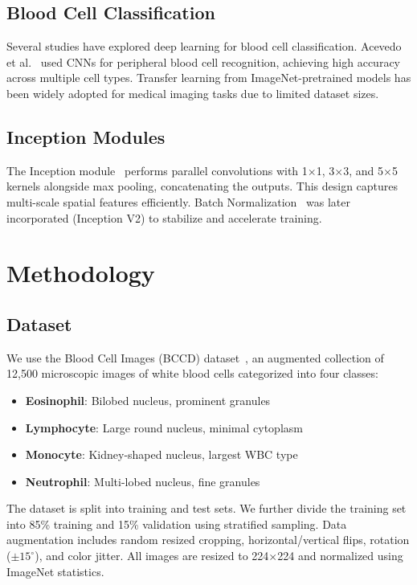\documentclass[conference]{IEEEtran}
\begin{document}
\subsection{Blood Cell Classification}

Several studies have explored deep learning for blood cell classification. Acevedo et al.~\cite{acevedo2020recognition} used CNNs for peripheral blood cell recognition, achieving high accuracy across multiple cell types. Transfer learning from ImageNet-pretrained models has been widely adopted for medical imaging tasks due to limited dataset sizes.

\subsection{Inception Modules}

The Inception module~\cite{szegedy2015going} performs parallel convolutions with 1$\times$1, 3$\times$3, and 5$\times$5 kernels alongside max pooling, concatenating the outputs. This design captures multi-scale spatial features efficiently. Batch Normalization~\cite{ioffe2015batch} was later incorporated (Inception V2) to stabilize and accelerate training.

\section{Methodology}

\subsection{Dataset}

We use the Blood Cell Images (BCCD) dataset~\cite{bccd_dataset}, an augmented collection of 12,500 microscopic images of white blood cells categorized into four classes:
\begin{itemize}
    \item \textbf{Eosinophil}: Bilobed nucleus, prominent granules
    \item \textbf{Lymphocyte}: Large round nucleus, minimal cytoplasm
    \item \textbf{Monocyte}: Kidney-shaped nucleus, largest WBC type
    \item \textbf{Neutrophil}: Multi-lobed nucleus, fine granules
\end{itemize}

The dataset is split into training and test sets. We further divide the training set into 85\% training and 15\% validation using stratified sampling. Data augmentation includes random resized cropping, horizontal/vertical flips, rotation ($\pm15^{\circ}$), and color jitter. All images are resized to 224$\times$224 and normalized using ImageNet statistics.
\end{document}

